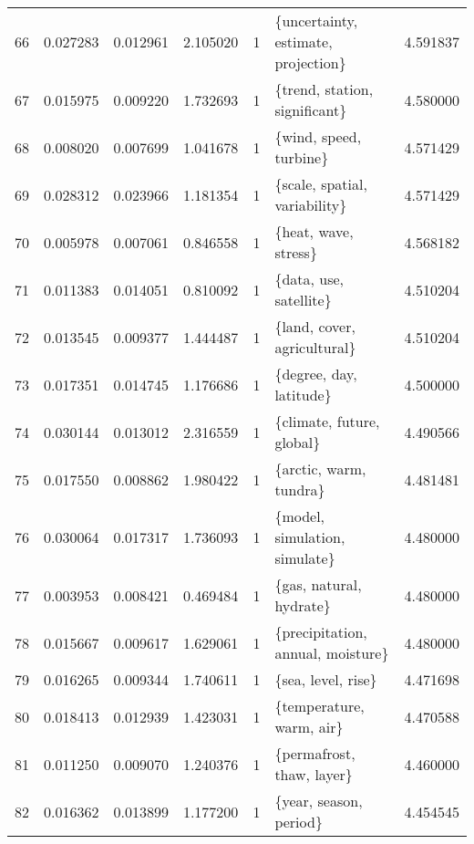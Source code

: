 \begin{tabular}{lrrrrlr}
66 &    0.027283 &  0.012961 &        2.105020 &           1 &     \{uncertainty, estimate, projection\} &  4.591837 \\
67 &    0.015975 &  0.009220 &        1.732693 &           1 &           \{trend, station, significant\} &  4.580000 \\
68 &    0.008020 &  0.007699 &        1.041678 &           1 &                  \{wind, speed, turbine\} &  4.571429 \\
69 &    0.028312 &  0.023966 &        1.181354 &           1 &           \{scale, spatial, variability\} &  4.571429 \\
70 &    0.005978 &  0.007061 &        0.846558 &           1 &                    \{heat, wave, stress\} &  4.568182 \\
71 &    0.011383 &  0.014051 &        0.810092 &           1 &                  \{data, use, satellite\} &  4.510204 \\
72 &    0.013545 &  0.009377 &        1.444487 &           1 &             \{land, cover, agricultural\} &  4.510204 \\
73 &    0.017351 &  0.014745 &        1.176686 &           1 &                 \{degree, day, latitude\} &  4.500000 \\
74 &    0.030144 &  0.013012 &        2.316559 &           1 &               \{climate, future, global\} &  4.490566 \\
75 &    0.017550 &  0.008862 &        1.980422 &           1 &                  \{arctic, warm, tundra\} &  4.481481 \\
76 &    0.030064 &  0.017317 &        1.736093 &           1 &           \{model, simulation, simulate\} &  4.480000 \\
77 &    0.003953 &  0.008421 &        0.469484 &           1 &                 \{gas, natural, hydrate\} &  4.480000 \\
78 &    0.015667 &  0.009617 &        1.629061 &           1 &       \{precipitation, annual, moisture\} &  4.480000 \\
79 &    0.016265 &  0.009344 &        1.740611 &           1 &                      \{sea, level, rise\} &  4.471698 \\
80 &    0.018413 &  0.012939 &        1.423031 &           1 &                \{temperature, warm, air\} &  4.470588 \\
81 &    0.011250 &  0.009070 &        1.240376 &           1 &               \{permafrost, thaw, layer\} &  4.460000 \\
82 &    0.016362 &  0.013899 &        1.177200 &           1 &                  \{year, season, period\} &  4.454545 \\

\end{tabular}
